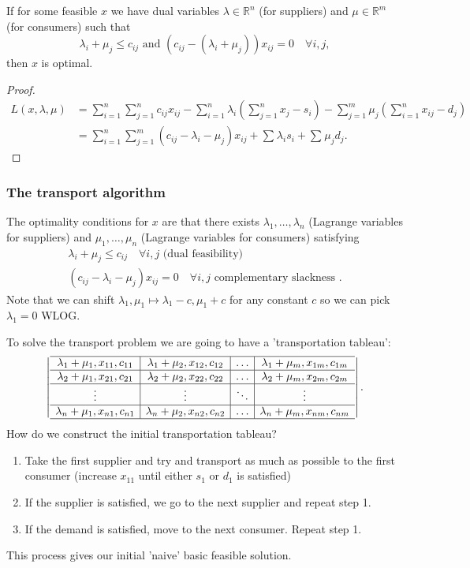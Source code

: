 \documentclass[egregdoesnotlikesansseriftitles,a4paper]{scrartcl}
\begin{document}
\begin{theorem}
	 If for some feasible $x$ we have dual variables $\lambda \in \mathbb{R}^{n} $ (for suppliers) and $\mu \in \mathbb{R}^{m} $ (for consumers) such that \[
	 \lambda_{i}+\mu_{j} \leq c_{ij} \text{  and  } (c_{ij}-(\lambda_{i}+\mu_j))x_{ij}=0 \quad  \forall i,j 
	 ,\] then $x$ is optimal.
\end{theorem}
\begin{proof}
	 \begin{align*}
		L (x,\lambda,\mu)&=\sum_{i=1}^{n}\sum_{j=1}^{n}c_{ij}x_{ij}-\sum_{i=1}^{n}\lambda_{i}(\sum_{j=1}^{n}x_{j}-s_i) - \sum_{j=1}^{m}\mu_{j} (\sum_{i=1}^{n}x_{ij}-d_{j})\\&=\sum_{i=1}^{n}\sum_{j=1}^{m}(c_{ij}-\lambda_{i}-\mu_{j})x_{ij}+\sum_{}^{}\lambda_{i}s_i +\sum_{}^{}\mu_{j}d_{j}.
	 \end{align*}
\end{proof}
\subsubsection{The transport algorithm}
The optimality conditions for $x$ are that there exists $\lambda_1 ,\ldots , \lambda_n$ (Lagrange variables for suppliers) and $\mu_1 ,\ldots ,\mu_{n}$ (Lagrange variables for consumers) satisfying 
\begin{align*}
	\lambda_{i} +\mu_{j} \leq c_{ij} \quad \forall i,j \text{ (dual feasibility) } \\
	(c_{ij}-\lambda_{i}-\mu_{j})x_{ij}=0 \quad \forall i,j \text{ complementary slackness }.
\end{align*}
Note that we can shift $\lambda_{1}, \mu_{1} \mapsto \lambda_{1}-c, \mu_{1}+c$ for any constant $c$ so we can pick $\lambda_1 =0$ WLOG.

To solve the transport problem we are going to have a 'transportation tableau': \[
\left|
	\begin{array}{c|c|c|c}
		\hline
		\lambda_1 +\mu_1 , x_{11} , c_{11} & \lambda_1 +\mu_2 , x_{12} , c_{12}&\ldots & \lambda_1 +\mu_m , x_{1m} , c_{1m}\\
		\hline
		\lambda_2 +\mu_1 , x_{21} , c_{21} & \lambda_2 +\mu_2 , x_{22} , c_{22}&\ldots & \lambda_2 +\mu_m , x_{2m} , c_{2m}\\
		\hline
		\vdots & \vdots &\ddots &\vdots \\
		\hline
		\lambda_n +\mu_1 , x_{n1} , c_{n1} & \lambda_n +\mu_2 , x_{n2} , c_{n2}&\ldots & \lambda_n +\mu_m , x_{nm} , c_{nm}\\
		\hline
	\end{array}
\right|
.\] 
 How do we construct the initial transportation tableau? 
 \begin{enumerate}
	 \item Take the first supplier and try and transport as much as possible to the first consumer (increase $x_{11} $ until either $s_1$ or $d_1 $ is satisfied)
	 \item If the supplier is satisfied, we go to the next supplier and repeat step 1.
	 \item If the demand is satisfied, move to the next consumer. Repeat step 1.
 \end{enumerate}  
 This process gives our initial 'naive' basic feasible solution. 
\end{document}
